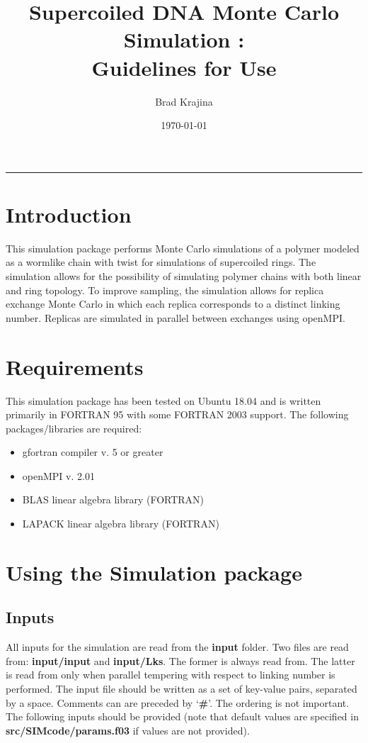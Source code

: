\documentclass[english]{article}
\title{Supercoiled DNA Monte Carlo Simulation : \\Guidelines for Use}
\author{Brad Krajina}
\date{\today}
\begin{document}
\maketitle
\vspace{-0.2in}
\rule{\linewidth}{0.4pt}

\section{Introduction}
This simulation package performs Monte Carlo simulations of a polymer modeled as a wormlike chain with twist for simulations of supercoiled rings. The simulation allows for the possibility of simulating polymer chains with both linear and ring topology. To improve sampling, the simulation allows for replica exchange Monte Carlo in which each replica corresponds to a distinct linking number. Replicas are simulated in parallel between exchanges using openMPI.
\section{Requirements}
This simulation package has been tested on Ubuntu 18.04 and is written primarily in FORTRAN 95 with some FORTRAN 2003 support. The following packages/libraries are required:
\begin{itemize}
\item gfortran compiler v. 5 or greater
\item openMPI v. 2.01 
\item BLAS linear algebra library (FORTRAN)
\item LAPACK linear algebra library (FORTRAN)
\end{itemize}

\section{Using the Simulation package}
\subsection{Inputs}
All inputs for the simulation are read from the \textbf{input} folder. Two files are read from: \textbf{input/input} and \textbf{input/Lks}. The former is always read from. The latter is read from only when parallel tempering with respect to linking number is performed. The input file should be written as a set of key-value pairs, separated by a space. Comments can are preceded by `\textbf{\#}'.  The ordering is not important. The following inputs should be provided (note that default values are specified in \textbf{src/SIMcode/params.f03} if values are not provided).
\end{document}
